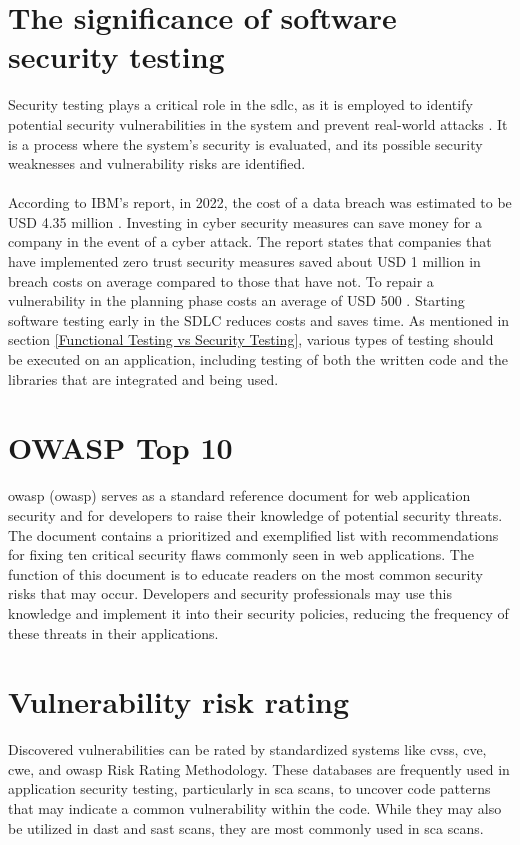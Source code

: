 \section{The significance of software security testing}
Security testing plays a critical role in the \acrlong{sdlc}, as it is employed to identify potential security vulnerabilities in the system and prevent real-world attacks \cite{whysectest}. It is a process where the system's security is evaluated, and its possible security weaknesses and vulnerability risks are identified. 
\\~\\
According to IBM's report, in 2022, the cost of a data breach was estimated to be USD 4.35 million \cite{databreach}. Investing in cyber security measures can save money for a company in the event of a cyber attack. The report states that companies that have implemented zero trust security measures saved about USD 1 million in breach costs on average compared to those that have not. To repair a vulnerability in the planning phase costs an average of USD 500 \cite{fixvulnerability}. Starting software testing early in the SDLC reduces costs and saves time. As mentioned in section \ref{Functional Testing vs Security Testing}, various types of testing should be executed on an application, including testing of both the written code and the libraries that are integrated and being used.

\section{OWASP Top 10}
\acrlong{owasp} (\acrshort{owasp}) serves as a standard reference document for web application security and for developers to raise their knowledge of potential security threats. The document contains a prioritized and exemplified list with recommendations for fixing ten critical security flaws commonly seen in web applications. The function of this document is to educate readers on the most common security risks that may occur. Developers and security professionals may use this knowledge and implement it into their security policies, reducing the frequency of these threats in their applications. 

\newpage
\section{Vulnerability risk rating}
Discovered vulnerabilities can be rated by standardized systems like \acrshort{cvss}, \acrshort{cve}, \acrshort{cwe}, and \acrshort{owasp} Risk Rating Methodology. These databases are frequently used in application security testing, particularly in \acrshort{sca} scans, to uncover code patterns that may indicate a common vulnerability within the code. While they may also be utilized in \acrshort{dast} and \acrshort{sast} scans, they are most commonly used in \acrshort{sca} scans. 



